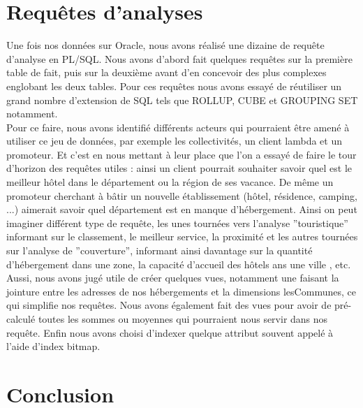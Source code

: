 \documentclass[a4paper,sffamily,12pt]{article}
\begin{document}
		\vspace{0.5cm}
			
	\section{Requêtes d'analyses}

		\vspace{0.5cm}
		
		Une fois nos données sur Oracle, nous avons réalisé une dizaine de requête d'analyse en PL/SQL. Nous avons d'abord fait quelques requêtes sur la première table de fait, puis sur la deuxième avant d'en concevoir des plus complexes englobant les deux tables. Pour ces requêtes nous avons essayé de réutiliser un grand nombre d'extension de SQL tels que ROLLUP, CUBE et GROUPING SET notamment. \\		
		
		Pour ce faire, nous avons identifié différents acteurs qui pourraient être amené à utiliser ce jeu de données, par exemple les collectivités, un client lambda et un promoteur. Et c'est en nous mettant à leur place que l'on a essayé de faire le tour d'horizon des requêtes utiles : ainsi un client pourrait souhaiter savoir quel est le meilleur hôtel dans le département ou la région de ses vacance. De même un promoteur cherchant à bâtir un nouvelle établissement (hôtel, résidence, camping, ...) aimerait savoir quel département est en manque d'hébergement. Ainsi on peut imaginer différent type de requête, les unes tournées vers l'analyse ''touristique'' informant sur le classement, le meilleur service, la proximité et les autres tournées sur l'analyse de ''couverture'', informant ainsi davantage sur la quantité d'hébergement dans une zone, la capacité d'accueil des hôtels ans une ville , etc. \\
		
		Aussi, nous avons jugé utile de créer quelques vues, notamment une faisant la jointure entre les adresses de nos hébergements et la dimensions lesCommunes, ce qui simplifie nos requêtes. Nous avons également fait des vues pour avoir de pré-calculé toutes les sommes ou moyennes qui pourraient nous servir dans nos requête. Enfin nous avons choisi d'indexer quelque attribut souvent appelé à l'aide d'index bitmap. \\
		
		\vspace{0.5cm}
																
	\section{Conclusion}
\end{document}

